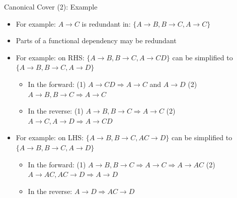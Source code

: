 \documentclass[aspectratio=169, xcolor=dvipsnames]{beamer}
\begin{document}
\begin{frame}{Canonical Cover (2): Example}
    \begin{itemize}[<+->]
        \item For example: $A \rightarrow C$ is redundant in: $\{A \rightarrow B, B \rightarrow C, A \rightarrow C\}$
        \item Parts of a functional dependency may be redundant
        \item For example: on RHS: $\{A \rightarrow B, B \rightarrow C, A \rightarrow CD\}$ can be simplified to $\{A \rightarrow B, B \rightarrow C, A \rightarrow D\}$
        \begin{itemize}
            \item[$\triangleright$] In the forward: (1) $A \rightarrow CD \Rightarrow A \rightarrow C$ and $A \rightarrow D$ (2) $A \rightarrow B, B \rightarrow C \Rightarrow A \rightarrow C$
            \item[$\triangleright$] In the reverse: (1) $A \rightarrow B, B \rightarrow C \Rightarrow A \rightarrow C$ (2) $A \rightarrow C, A \rightarrow D \Rightarrow A \rightarrow CD$
        \end{itemize}
        \item For example: on LHS: $\{A \rightarrow B, B \rightarrow C, AC \rightarrow D\}$ can be simplified to $\{A \rightarrow B, B \rightarrow C, A \rightarrow D\}$
        \begin{itemize}
            \item[$\triangleright$] In the forward: (1) $A \rightarrow B, B \rightarrow C \Rightarrow A \rightarrow C \Rightarrow A \rightarrow AC$ (2) $A \rightarrow AC, AC \rightarrow D \Rightarrow A \rightarrow D$
            \item[$\triangleright$] In the reverse: $A \rightarrow D \Rightarrow AC \rightarrow D$
        \end{itemize}
    \end{itemize}
\end{frame}
\end{document}

